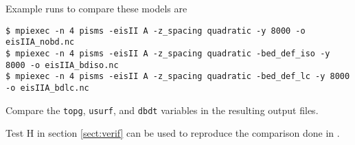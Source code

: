 Example runs to compare these models are
\begin{verbatim}
$ mpiexec -n 4 pisms -eisII A -z_spacing quadratic -y 8000 -o eisIIA_nobd.nc
$ mpiexec -n 4 pisms -eisII A -z_spacing quadratic -bed_def_iso -y 8000 -o eisIIA_bdiso.nc
$ mpiexec -n 4 pisms -eisII A -z_spacing quadratic -bed_def_lc -y 8000 -o eisIIA_bdlc.nc
\end{verbatim}
Compare the \verb|topg|, \verb|usurf|, and \verb|dbdt| variables in the resulting output files.

Test H in section \ref{sect:verif} can be used to reproduce the comparison done in \cite{BLKfastearth}.


